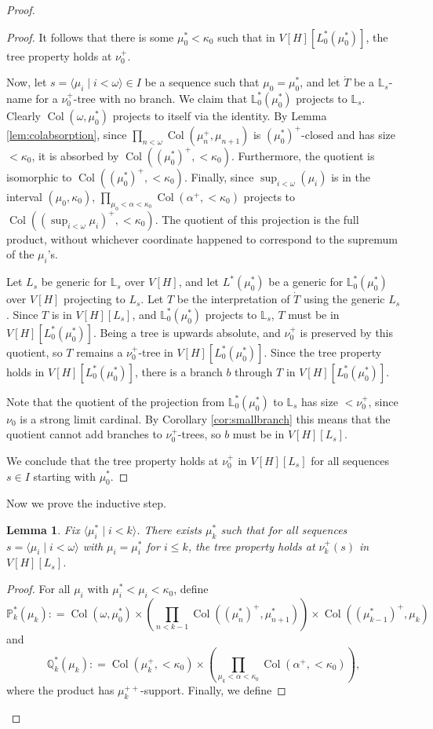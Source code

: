 \documentclass[psamsfonts]{amsart}
\newtheorem{lemma}[thm]{Lemma}
\theoremstyle{definition}
\newcommand{\defeq}{\mathrel{\mathop:}=}
\newcommand{\Q}{\mathbb{Q}}
\newcommand{\PP}{\mathbb{P}}
\newcommand{\LL}{\mathbb{L}}
\newcommand{\ka}{\kappa}
\newcommand{\w}{\omega}
\DeclareMathOperator{\Coll}{Col}
\numberwithin{equation}{section}
\begin{document}
\begin{proof}
\begin{proof}
	It follows that there is some $\mu^*_0 < \ka_0$ such that in $V[H][L^*_0(\mu^*_0)]$, the tree property holds at $\nu_0^+$.
	
	Now, let $s = \langle \mu_i \mid i < \w\rangle \in I$ be a sequence such that $\mu_0 = \mu^*_0$, and let $\dot{T}$ be a $\LL_s$-name for a $\nu_0^+$-tree with no branch. We claim that $\LL_0^*(\mu^*_0)$ projects to $\LL_s$. Clearly $\Coll(\w,\mu^*_0)$ projects to itself via the identity. By Lemma \ref{lem:colabsorption}, since $\prod_{n<\w} \Coll(\mu_{n}^+, \mu_{n+1})$ is $(\mu^*_0)^+$-closed and has size $<\ka_0$, it is absorbed by $\Coll((\mu^*_0)^+, <\ka_0)$. Furthermore, the quotient is isomorphic to $\Coll((\mu^*_0)^+, <\ka_0)$. Finally, since $\sup_{i<\w}(\mu_i)$ is in the interval $(\mu_0, \ka_0)$, $\prod_{\mu_0 < \alpha < \ka_0} \Coll(\alpha^+, <\ka_0)$ projects to $\Coll((\sup_{i<\w}\mu_i)^+, <\ka_0)$. The quotient of this projection is the full product, without whichever coordinate happened to correspond to the supremum of the $\mu_i$'s.
	
	Let $L_s$ be generic for $\LL_s$ over $V[H]$, and let $L^*(\mu_0^*)$ be a generic for $\LL_0^*(\mu_0^*)$ over $V[H]$ projecting to $L_s$. Let $T$ be the interpretation of $\dot{T}$ using the generic $L_s$. Since $T$ is in $V[H][L_s]$, and $\LL_0^*(\mu^*_0)$ projects to $\LL_s$, $T$ must be in $V[H][L_0^*(\mu^*_0)]$. Being a tree is upwards absolute, and $\nu_0^+$ is preserved by this quotient, so $T$ remains a $\nu_0^+$-tree in $V[H][L_0^*(\mu_0^*)]$. Since the tree property holds in $V[H][L_0^*(\mu^*_0)]$, there is a branch $b$ through $T$ in $V[H][L_0^*(\mu^*_0)]$.
	
	Note that the quotient of the projection from $\LL_0^*(\mu^*_0)$ to $\LL_s$ has size $<\nu_0^+$, since $\nu_0$ is a strong limit cardinal. By Corollary \ref{cor:smallbranch} this means that the quotient cannot add branches to $\nu_0^+$-trees, so $b$ must be in $V[H][L_s]$.
	
	We conclude that the tree property holds at $\nu_0^+$ in $V[H][L_s]$ for all sequences $s \in I$ starting with $\mu^*_0$.
	\end{proof}
	
	Now we prove the inductive step.
	
	\begin{lemma}\label{lem:indtp}
		Fix $\langle \mu^*_i \mid i<k\rangle$. There exists $\mu_k^*$ such that for all sequences $s = \langle \mu_i \mid i<\w\rangle$ with $\mu_i = \mu_i^*$ for $i \leq k$, the tree property holds at $\nu_k^+(s)$ in $V[H][L_s]$.
	\end{lemma}
	\begin{proof}
		For all $\mu_i$ with $\mu^*_i < \mu_i < \ka_0$, define
		\[\PP^*_k(\mu_k) \defeq \Coll(\w, \mu_0^*) \times \left(\prod_{n<k-1}\Coll((\mu^*_n)^+, \mu^*_{n+1})\right)\times \Coll((\mu^*_{k-1})^+, \mu_k)\]
		and
		\[\Q^*_k(\mu_k) \defeq \Coll(\mu_k^+, <\ka_0) \times \left(\prod_{\mu_k < \alpha < \ka_0} \Coll(\alpha^+, <\ka_0)\right),\]
		where the product has $\mu_k^{++}$-support. Finally, we define
		

\end{proof}
\end{proof}
\end{document}

